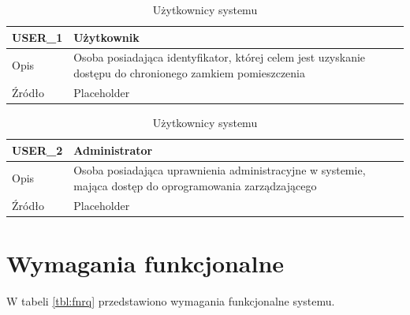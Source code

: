         \begin{table}
            \caption{Użytkownicy systemu}
            \centering
            \begin{subtable}[c]{\textwidth}
                \centering
                \begin{tabular}{|p{2cm}|p{10cm}|}
                    \hline USER\_1      & Użytkownik \\
                    \hline Opis         & Osoba posiadająca identyfikator, której celem jest uzyskanie dostępu do chronionego zamkiem pomieszczenia  \\
                    \hline Źródło       & Placeholder    \\
                    \hline
                \end{tabular}
                \label{tbl:usr1}
                \vspace{10mm}           
            \end{subtable}
        \quad%
            \begin{subtable}[c]{\textwidth}
                \centering
                \begin{tabular}{|p{2cm}|p{10cm}|}
                    \hline USER\_2      & Administrator \\
                    \hline Opis         & Osoba posiadająca uprawnienia administracyjne w systemie, mająca dostęp do oprogramowania zarządzającego \\
                    \hline Źródło       & Placeholder    \\
                    \hline
                \end{tabular}
                \label{tbl:usr2}
                \vspace{10mm}           
            \end{subtable}                
            \label{tbl:users}
        \end{table}

    \section{Wymagania funkcjonalne}

        W tabeli \ref{tbl:fnrq} przedstawiono wymagania funkcjonalne systemu.

